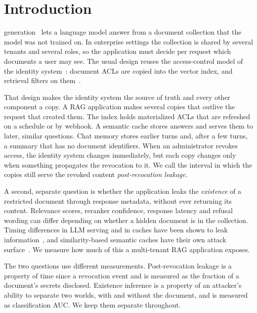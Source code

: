 \section{Introduction}
\label{sec:intro}

 generation~\cite{lewis2020rag} lets a language model answer from a document collection that the model was not trained on. In enterprise settings the collection is shared by several tenants and several roles, so the application must decide per request which documents a user may see. The usual design reuses the access-control model of the identity system~\cite{sandhu1996rbac}: document ACLs are copied into the vector index, and retrieval filters on them~\cite{jeong2025permissionrag,chen2025integrating,zhong2026honeybee}.

That design makes the identity system the source of truth and every other component a copy. A RAG application makes several copies that outlive the request that created them. The index holds materialized ACLs that are refreshed on a schedule or by webhook. A semantic cache stores answers and serves them to later, similar questions. Chat memory stores earlier turns and, after a few turns, a summary that has no document identifiers. When an administrator revokes access, the identity system changes immediately, but each copy changes only when something propagates the revocation to it. We call the interval in which the copies still serve the revoked content \emph{post-revocation leakage}.

A second, separate question is whether the application leaks the \emph{existence} of a restricted document through response metadata, without ever returning its content. Relevance scores, reranker confidence, response latency and refusal wording can differ depending on whether a hidden document is in the collection. Timing differences in LLM serving and in caches have been shown to leak information~\cite{gu2025auditing,song2025earlybird}, and similarity-based semantic caches have their own attack surface~\cite{zhang2026keycollision,afiffy2026semanticcache}. We measure how much of this a multi-tenant RAG application exposes.

The two questions use different measurements. Post-revocation leakage is a property of time since a revocation event and is measured as the fraction of a document's secrets disclosed. Existence inference is a property of an attacker's ability to separate two worlds, with and without the document, and is measured as classification AUC. We keep them separate throughout.

